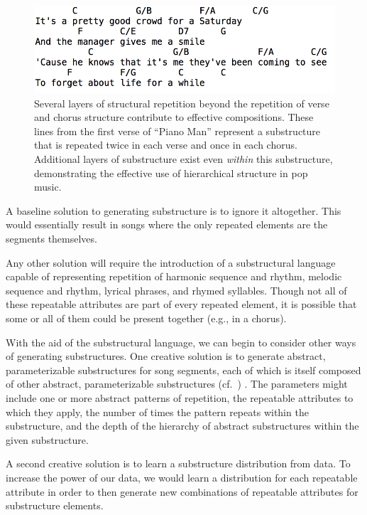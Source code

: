 \documentclass[11pt,phd]{byuprop}
\begin{document}
\begin{figure}
  \centering
  \includegraphics[width=.5\textwidth]{graphics/subtructure_example.png}
  \caption{Several layers of structural repetition beyond the repetition of verse and chorus structure contribute to effective compositions. These lines from the first verse of ``Piano Man'' represent a substructure that is repeated twice in each verse and once in each chorus. Additional layers of substructure exist even \emph{within} this substructure, demonstrating the effective use of hierarchical structure in pop music.}
    \label{fig:substructure_example}
\end{figure}

A baseline solution to generating substructure is to ignore it altogether. This would essentially result in songs where the only repeated elements are the segments themselves.

Any other solution will require the introduction of a substructural language capable of representing repetition of harmonic sequence and rhythm, melodic sequence and rhythm, lyrical phrases, and rhymed syllables. Though not all of these repeatable attributes are part of every repeated element, it is possible that some or all of them could be present together (e.g., in a chorus). %

With the aid of the substructural language, we can begin to consider other ways of generating substructures. One creative solution is to generate abstract, parameterizable substructures for song segments, each of which is itself composed of other abstract, parameterizable substructures (cf.~\cite{lebaron2015intelligent}) . The parameters might include one or more abstract patterns of repetition, the repeatable attributes to which they apply, the number of times the pattern repeats within the substructure, and the depth of the hierarchy of abstract substructures within the given substructure.

A second creative solution is to learn a substructure distribution from data. To increase the power of our data, we would learn a distribution for each repeatable attribute in order to then generate new combinations of repeatable attributes for substructure elements.
\end{document}

